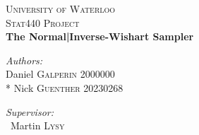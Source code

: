 \documentclass[english]{report}
\begin{document}
\begin{titlepage}
\begin{center}


\textsc{\LARGE University of Waterloo}\\[1.5cm]

\textsc{\Large Stat440 Project}\\[0.5cm]

{ \huge \bfseries The Normal|Inverse-Wishart Sampler \\[0.4cm] }


\begin{minipage}{0.4\textwidth}
\begin{flushleft} \large
\emph{Authors:}\\
Daniel \textsc{Galperin} 2000000\\*
Nick \textsc{Guenther} 20230268
\end{flushleft}
\end{minipage}
\begin{minipage}{0.4\textwidth}
\begin{flushright} \large
\emph{Supervisor:} \\
~Martin \textsc{Lysy}
\end{flushright}
\end{minipage}


\end{center}
\end{titlepage}






\newpage

\tableofcontents %
\end{document}
